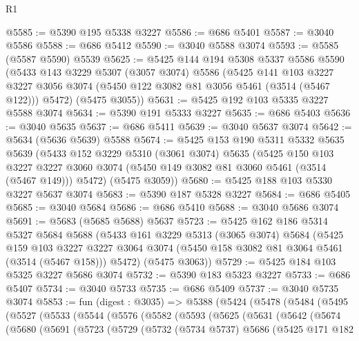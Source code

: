 \begin{lexlean}{R1}
\begin{coremodule}
@5585 := @5390 @195 @5338 @3227
@5586 := @686 @5401
@5587 := @3040 @5586
@5588 := @686 @5412
@5590 := @3040 @5588 @3074
@5593 := @5585 (@5587 @5590) @5539
@5625 := @5425
    @144
    @194
    @5308
    @5337
    @5586
    @5590
    (@5433
      @143
      @3229
      @5307
      (@3057 @3074)
      @5586
      (@5425
        @141
        @103
        @3227
        @3227
        @3056
        @3074
        (@5450 @122 @3082 @81 @3056 @5461 (@3514 (@5467 @122)))
        @5472)
      (@5475 @3055))
@5631 := @5425 @192 @103 @5335 @3227 @5588 @3074
@5634 := @5390 @191 @5333 @3227
@5635 := @686 @5403
@5636 := @3040 @5635
@5637 := @686 @5411
@5639 := @3040 @5637 @3074
@5642 := @5634 (@5636 @5639) @5588
@5674 := @5425
    @153
    @190
    @5311
    @5332
    @5635
    @5639
    (@5433
      @152
      @3229
      @5310
      (@3061 @3074)
      @5635
      (@5425
        @150
        @103
        @3227
        @3227
        @3060
        @3074
        (@5450 @149 @3082 @81 @3060 @5461 (@3514 (@5467 @149)))
        @5472)
      (@5475 @3059))
@5680 := @5425 @188 @103 @5330 @3227 @5637 @3074
@5683 := @5390 @187 @5328 @3227
@5684 := @686 @5405
@5685 := @3040 @5684
@5686 := @686 @5410
@5688 := @3040 @5686 @3074
@5691 := @5683 (@5685 @5688) @5637
@5723 := @5425
    @162
    @186
    @5314
    @5327
    @5684
    @5688
    (@5433
      @161
      @3229
      @5313
      (@3065 @3074)
      @5684
      (@5425
        @159
        @103
        @3227
        @3227
        @3064
        @3074
        (@5450 @158 @3082 @81 @3064 @5461 (@3514 (@5467 @158)))
        @5472)
      (@5475 @3063))
@5729 := @5425 @184 @103 @5325 @3227 @5686 @3074
@5732 := @5390 @183 @5323 @3227
@5733 := @686 @5407
@5734 := @3040 @5733
@5735 := @686 @5409
@5737 := @3040 @5735 @3074
@5853 := fun (digest : @3035) =>
  @5388
    (@5424
      (@5478
        (@5484
          (@5495
            (@5527
              (@5533
                (@5544
                  (@5576
                    (@5582
                      (@5593
                        (@5625
                          (@5631
                            (@5642
                              (@5674
                                (@5680
                                  (@5691
                                    (@5723
                                      (@5729
                                        (@5732
                                          (@5734 @5737)
                                          @5686
                                          (@5425
                                            @171
                                            @182

\end{coremodule}
\end{lexlean}
